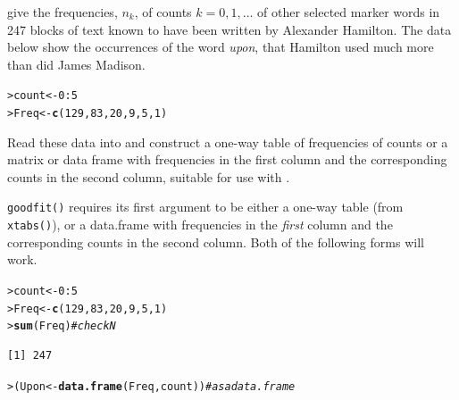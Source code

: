 \documentclass[10pt]{report}\usepackage[]{graphicx}\usepackage[]{color}
\makeatletter
\newcommand{\hlnum}[1]{\textcolor[rgb]{0.686,0.059,0.569}{#1}}%
\newcommand{\hlcom}[1]{\textcolor[rgb]{0.678,0.584,0.686}{\textit{#1}}}%
\newcommand{\hlopt}[1]{\textcolor[rgb]{0,0,0}{#1}}%
\newcommand{\hlstd}[1]{\textcolor[rgb]{0.345,0.345,0.345}{#1}}%
\newcommand{\hlkwb}[1]{\textcolor[rgb]{0.69,0.353,0.396}{#1}}%
\newcommand{\hlkwd}[1]{\textcolor[rgb]{0.737,0.353,0.396}{\textbf{#1}}}%
\newenvironment{kframe}{%
 \def\at@end@of@kframe{}%
 \ifinner\ifhmode%
  \def\at@end@of@kframe{\end{minipage}}%
  \begin{minipage}{\columnwidth}%
 \fi\fi%
 \def\FrameCommand##1{\hskip\@totalleftmargin \hskip-\fboxsep
 \colorbox{shadecolor}{##1}\hskip-\fboxsep
     \hskip-\linewidth \hskip-\@totalleftmargin \hskip\columnwidth}%
 \MakeFramed {\advance\hsize-\width
   \@totalleftmargin\z@ \linewidth\hsize
   \@setminipage}}%
 {\par\unskip\endMakeFramed%
 \at@end@of@kframe}
\newenvironment{knitrout}{}{} %
\renewenvironment{knitrout}{\small\renewcommand{\baselinestretch}{.85}}{} %
\makeatother
\begin{document}
\begin{Exercises}
  \exercise \citet[Table 2.4]{MostellerWallace:63} give the frequencies, $n_k$,
  of counts $k = 0, 1, \dots$ of other selected marker words in 247 blocks
  of text known to have been written by Alexander Hamilton.  The data below
  show the occurrences of the word \emph{upon}, that Hamilton used much more than
  did James Madison.
\begin{knitrout}\footnotesize
{}\color{fgcolor}\begin{kframe}
\begin{alltt}
\hlstd{> }\hlstd{count} \hlkwb{<-} \hlnum{0} \hlopt{:} \hlnum{5}
\hlstd{> }\hlstd{Freq} \hlkwb{<-} \hlkwd{c}\hlstd{(}\hlnum{129}\hlstd{,} \hlnum{83}\hlstd{,} \hlnum{20}\hlstd{,} \hlnum{9}\hlstd{,} \hlnum{5}\hlstd{,} \hlnum{1}\hlstd{)}
\end{alltt}
\end{kframe}
\end{knitrout}
  \begin{enumerate*}
    \item Read these data into \R and construct a one-way table of frequencies of counts
    or a matrix or data frame with frequencies in the first column and the corresponding counts in the second column, 
    suitable for use with .
    \begin{ans}
    \texttt{goodfit()} requires its first argument to be either a one-way table (from \texttt{xtabs()}),
    or a data.frame with frequencies in the \emph{first} column and the corresponding counts in the second column.  
    Both of the following forms will work.
\begin{knitrout}\footnotesize
{}\color{fgcolor}\begin{kframe}
\begin{alltt}
\hlstd{> }\hlstd{count} \hlkwb{<-} \hlnum{0}\hlopt{:}\hlnum{5}
\hlstd{> }\hlstd{Freq} \hlkwb{<-} \hlkwd{c}\hlstd{(}\hlnum{129}\hlstd{,} \hlnum{83}\hlstd{,} \hlnum{20}\hlstd{,} \hlnum{9}\hlstd{,} \hlnum{5}\hlstd{,} \hlnum{1}\hlstd{)}
\hlstd{> }\hlkwd{sum}\hlstd{(Freq)}  \hlcom{# check N}
\end{alltt}
\begin{verbatim}
[1] 247
\end{verbatim}
\begin{alltt}
\hlstd{> }\hlstd{(Upon} \hlkwb{<-} \hlkwd{data.frame}\hlstd{(Freq, count))}             \hlcom{# as a data.frame}
\end{alltt}
\begin{verbatim}

\end{verbatim}
\end{kframe}
\end{knitrout}
\end{ans}
\end{enumerate*}
\end{Exercises}
\end{document}
